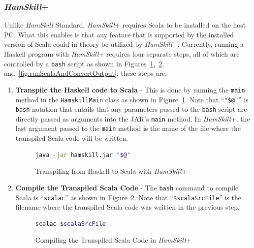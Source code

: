 \documentclass{report}
\begin{document}
\subsubsection{\textit{HamSkill}+}

Unlike \textit{HamSkill} Standard, \textit{HamSkill}+ requires Scala to be installed on the host PC.  What this enables is that any feature that is supported by the installed version of Scala could in theory be utilized by \textit{HamSkill}+.  Currently, running a Haskell program with \textit{HamSkill}+ requires four separate steps, all of which are controlled by a \texttt{bash} script as shown in Figures~\ref{fig:runHamSkill},~\ref{fig:compileScala}, and~\ref{fig:runScalaAndConvertOutput}; these steps are:

\begin{enumerate}

\item \textbf{Transpile the Haskell code to Scala} - This is done by running the \texttt{main} method in the \texttt{HamskillMain} class as shown in Figure~\ref{fig:runHamSkill}.  Note that ``\texttt{"\$@"}'' is \texttt{bash} notation that entails that any parameters passed to the \texttt{bash} script are directly passed as arguments into the JAR's \texttt{main} method.  In \textit{HamSkill}+, the last argument passed to the \texttt{main} method is the name of the file where the transpiled Scala code will be written.

\begin{figure}[H]
\begin{mdframed}
\begin{lstlisting}[language=bash, upquote=true]
java -jar hamskill.jar "$@"
\end{lstlisting}
\end{mdframed}
\caption{Transpiling from Haskell to Scala with \textit{HamSkill}+}\label{fig:runHamSkill}
\end{figure}

\item \textbf{Compile the Transpiled Scala Code} - The \texttt{bash} command to compile Scala is ``\texttt{scalac}'' as shown in Figure~\ref{fig:compileScala}.  Note that ``\texttt{\$scalaSrcFile}'' is the filename where the transpiled Scala code was written in the previous step.

\begin{figure}[H]
\begin{mdframed}
\begin{lstlisting}[language=bash]
scalac $scalaSrcFile
\end{lstlisting}
\end{mdframed}
\caption{Compiling the Transpiled Scala Code in \textit{HamSkill}+}\label{fig:compileScala}
\end{figure}


\end{enumerate}
\end{document}
